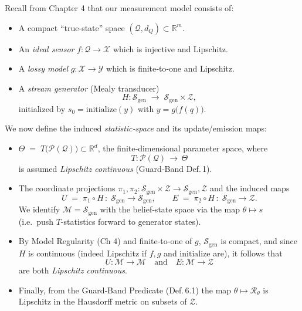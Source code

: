 \documentclass[12pt]{article}
\theoremstyle{definition}
\theoremstyle{plain}
\begin{document}
Recall from Chapter 4 that our measurement model consists of:
\begin{itemize}
  \item A compact “true‐state” space $(\mathcal Q,d_Q)\subset\mathbb{R}^m$.
  \item An \emph{ideal sensor} $f:\mathcal Q\to\mathcal X$ which is injective and Lipschitz.
  \item A \emph{lossy model} $g:\mathcal X\to\mathcal Y$ which is finite‐to‐one and Lipschitz.
  \item A \emph{stream generator} (Mealy transducer)
    \[
      H:\mathcal S_{\mathrm{gen}}\;\longrightarrow\;
         \mathcal S_{\mathrm{gen}}\times\mathcal Z,
    \]
    initialized by $s_0=\mathrm{initialize}(y)$ with $y=g\bigl(f(q)\bigr)$.
\end{itemize}

We now define the induced \emph{statistic‐space} and its update/emission maps:

\begin{itemize}
  \item \(\displaystyle \Theta\;=\;T\bigl(\mathcal P(\mathcal Q)\bigr)\subset\mathbb{R}^d\), the finite‐dimensional
        parameter space, where
        \[
          T:\mathcal P(\mathcal Q)\,\longrightarrow\,\Theta
        \]
        is assumed \emph{Lipschitz continuous} (Guard‑Band Def.\,1).

  \item The coordinate projections
        \(
          \pi_1,\pi_2:\mathcal S_{\mathrm{gen}}\times\mathcal Z\to
                        \mathcal S_{\mathrm{gen}},\mathcal Z
        \)
        and the induced maps
        \[
          U\;=\;\pi_1\circ H\,:\;\mathcal S_{\mathrm{gen}}\to\mathcal S_{\mathrm{gen}},
          \qquad
          E\;=\;\pi_2\circ H\,:\;\mathcal S_{\mathrm{gen}}\to\mathcal Z.
        \]
        We identify 
        \(\mathcal M=\mathcal S_{\mathrm{gen}}\)
        with the belief‐state space via the map
        \(\theta\mapsto s\) (i.e.\ push \(T\)-statistics forward to generator states).

  \item By Model Regularity (Ch 4) and finite‐to‐one of \(g\),
        \(\mathcal S_{\mathrm{gen}}\) is compact, and since \(H\) is continuous (indeed Lipschitz
        if \(f,g\) and \(\mathrm{initialize}\) are), it follows that
        \[
          U:\mathcal M\to\mathcal M
          \quad\text{and}\quad
          E:\mathcal M\to\mathcal Z
        \]
        are both \emph{Lipschitz continuous}.

  \item Finally, from the Guard‑Band Predicate (Def.\,6.1) the map
        \(\theta\mapsto\mathcal R_{\theta}\) is Lipschitz
        in the Hausdorff metric on subsets of \(\mathcal Z\).
\end{itemize}
\end{document}
